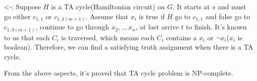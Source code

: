 {<-: Suppose $H$ is a TA cycle(Hamiltonian circuit) on $G$. It starts at $s$ and must go either $c_{1,1}$ or $c_{1,3(m+1)}$. Assume that $x_i$ is true if $H$ go to $c_{1,1}$ and false go to $c_{1,3(m+1)}$, continue to go through $x_2,..,x_n$, at last arrive $t$ to finish. It's known to us that each $C_i$ is traversed, which means each $C_i$ contains a $x_i$ or $\neg x_i$($x_i$ is boolean). Therefore, we can find a satisfying truth assignment when there is a TA cycle.

From the above aspects, it's proved that TA cycle problem is NP-complete.

}